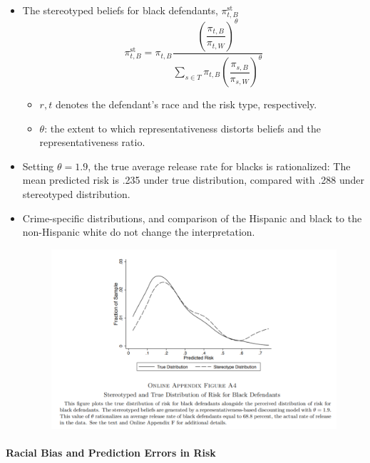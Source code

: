 \documentclass[../root]{subfiles}
\begin{document}
    \begin{itemize}
      \item The stereotyped beliefs for black defendants, $\pi_{t, B}^{\text{st}}$
      \[
      \pi_{t, B}^{\text{st}} = \pi_{t, B}
      \dfrac{\left( \dfrac{\pi_{t, B}}{\pi_{t, W}} \right)^\theta}
      {\sum_{s \in T} \pi_{t, B} \left( \dfrac{\pi_{s, B}}{\pi_{s, W}} \right)^\theta}
      \]
      \begin{itemize}
        \item $r, t$ denotes the defendant's race and the risk type, respectively.
        \item $\theta$: the extent to which representativeness distorts beliefs and the representativeness ratio.
      \end{itemize}
      \item Setting $\theta = 1.9$, the true average release rate for blacks is rationalized: The mean predicted risk is .235 under true distribution, compared with .288 under stereotyped distribution.
      \item Crime-specific distributions, and comparison of the Hispanic and black to the non-Hispanic white do not change the interpretation.
      \begin{figure}[h]
        \centering
        \includegraphics[scale = 1]{os0707tanji/ADY_FA4}
      \end{figure}
    \end{itemize}

    \paragraph{Racial Bias and Prediction Errors in Risk}
\end{document}
